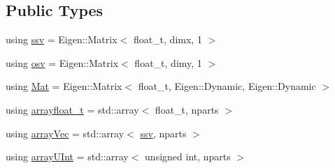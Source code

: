 \subsection*{Public Types}
\begin{DoxyCompactItemize}
\item 
using \hyperlink{classAPF_a8b170471292cd6fb5c3c19b55b42fc4e}{ssv} = Eigen\+::\+Matrix$<$ float\+\_\+t, dimx, 1 $>$
\item 
using \hyperlink{classAPF_ae4887b3f7121a7509397dd00bffedfe0}{osv} = Eigen\+::\+Matrix$<$ float\+\_\+t, dimy, 1 $>$
\item 
using \hyperlink{classAPF_ac241705f732b7e0a0bc1a3bc518a92d2}{Mat} = Eigen\+::\+Matrix$<$ float\+\_\+t, Eigen\+::\+Dynamic, Eigen\+::\+Dynamic $>$
\item 
using \hyperlink{classAPF_a5442e395afcd4c0712e58fdd103d4d52}{arrayfloat\+\_\+t} = std\+::array$<$ float\+\_\+t, nparts $>$
\item 
using \hyperlink{classAPF_a56d9b8e823c69721d7f19a657b0509ed}{array\+Vec} = std\+::array$<$ \hyperlink{classAPF_a8b170471292cd6fb5c3c19b55b42fc4e}{ssv}, nparts $>$
\item 
using \hyperlink{classAPF_a89fadc4d61a1cb4eaa63d3fca4d43284}{array\+U\+Int} = std\+::array$<$ unsigned int, nparts $>$
\end{DoxyCompactItemize}
